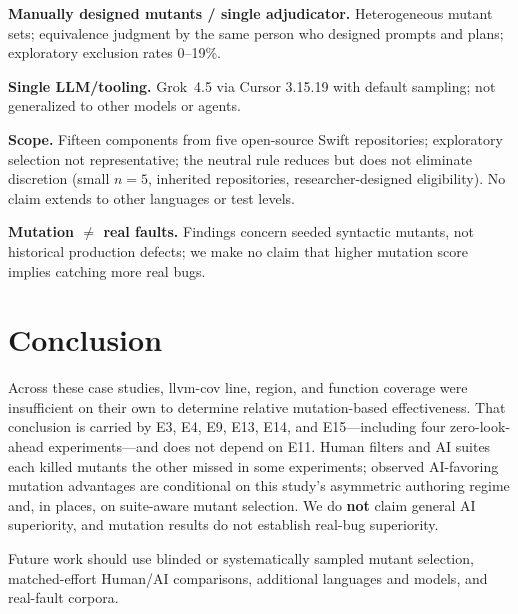\documentclass[10pt,conference,a4paper]{IEEEtran}
\begin{document}
\textbf{Manually designed mutants / single adjudicator.} Heterogeneous mutant sets; equivalence judgment by the same person who designed prompts and plans; exploratory exclusion rates 0--19\%.

\textbf{Single LLM/tooling.} Grok~4.5 via Cursor 3.15.19 with default sampling; not generalized to other models or agents.

\textbf{Scope.} Fifteen components from five open-source Swift repositories; exploratory selection not representative; the neutral rule reduces but does not eliminate discretion (small $n{=}5$, inherited repositories, researcher-designed eligibility). No claim extends to other languages or test levels.

\textbf{Mutation $\neq$ real faults.} Findings concern seeded syntactic mutants, not historical production defects; we make no claim that higher mutation score implies catching more real bugs.

\section{Conclusion}
Across these case studies, llvm-cov line, region, and function coverage were insufficient on their own to determine relative mutation-based effectiveness. That conclusion is carried by E3, E4, E9, E13, E14, and E15---including four zero-look-ahead experiments---and does not depend on E11. Human filters and AI suites each killed mutants the other missed in some experiments; observed AI-favoring mutation advantages are conditional on this study's asymmetric authoring regime and, in places, on suite-aware mutant selection. We do \textbf{not} claim general AI superiority, and mutation results do not establish real-bug superiority.

Future work should use blinded or systematically sampled mutant selection, matched-effort Human/AI comparisons, additional languages and models, and real-fault corpora.



\end{document}
